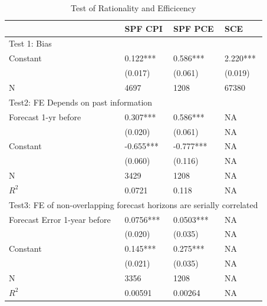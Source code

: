 \documentclass[]{article}
\begin{document}
\begin{table}[]\label{NullTestTable}
	\caption{Test of Rationality and Efficicency}
	\centering 
\begin{tabular}{llll}
	\hline 
	& SPF CPI          & SPF PCE          & SCE            \\
	\hline 
	\multicolumn{4}{l}{Test 1: Bias}                                                           \\
	\hline 
	Constant                            & 0.122***         & 0.586***         & 2.220***       \\
	& (0.017)          & (0.061)          & (0.019)        \\
	\hline 
	N                                   & 4697             & 1208             & 67380          \\
	\hline 
	\multicolumn{4}{l}{Test2: FE Depends on past information}                                  \\
	\hline 
	Forecast 1-yr before                & 0.307***         & 0.586***         & NA             \\
	& (0.020)          & (0.061)          & NA             \\
	Constant                            & -0.655***        & -0.777***        & NA             \\
	& (0.060)          & (0.116)          & NA             \\
	\hline 
	N                                   & 3429             & 1208             & NA             \\
	$R^2$                 & 0.0721           & 0.118            & NA             \\
	\hline 
	\multicolumn{4}{l}{Test3: FE of non-overlapping forecast horizons are serially correlated} \\
	\hline 
	Forecast Error 1-year before        & 0.0756***        & 0.0503***        & NA             \\
	& (0.020)          & (0.035)          & NA             \\
	Constant                            & 0.145***         & 0.275***         & NA             \\
	& (0.021)          & (0.035)          & NA             \\
	\hline 
	N                                   & 3356             & 1208             & NA             \\
	$R^2$                   & 0.00591          & 0.00264          & NA             \\

\end{tabular}
\end{table}
\end{document}
